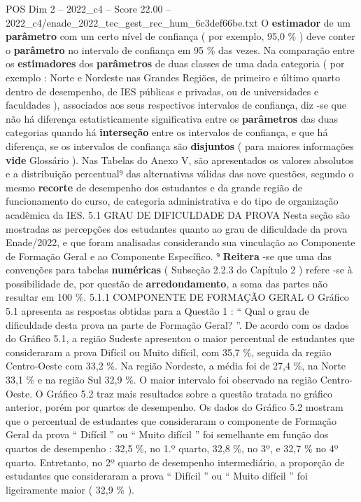\begin{textsample}{POS Dim 2 – 2022\_c4 – Score 22.00 – 2022\_c4/enade\_2022\_tec\_gest\_rec\_hum\_6c3def66be.txt}
O \textbf{estimador} de um \textbf{parâmetro} com um certo nível de confiança ( por exemplo, 95,0 \% ) deve conter o \textbf{parâmetro} no intervalo de confiança em 95 \% das vezes.
Na comparação entre os \textbf{estimadores} dos \textbf{parâmetros} de duas classes de uma dada categoria ( por exemplo : Norte e Nordeste nas Grandes Regiões, de primeiro e último quarto dentro de desempenho, de IES públicas e privadas, ou de universidades e faculdades ), associados aos seus respectivos intervalos de confiança, diz -se que não há diferença estatisticamente significativa entre os \textbf{parâmetros} das duas categorias quando há \textbf{interseção} entre os intervalos de confiança, e que há diferença, se os intervalos de confiança são \textbf{disjuntos} ( para maiores informações \textbf{vide} Glossário ).
Nas Tabelas do Anexo V, são apresentados os valores absolutos e a distribuição percentual⁹ das alternativas válidas das nove questões, segundo o mesmo \textbf{recorte} de desempenho dos estudantes e da grande região de funcionamento do curso, de categoria administrativa e do tipo de organização acadêmica da IES. 5.1 GRAU DE DIFICULDADE DA PROVA Nesta seção são mostradas as percepções dos estudantes quanto ao grau de dificuldade da prova Enade/2022, e que foram analisadas considerando sua vinculação ao Componente de Formação Geral e ao Componente Específico. ⁹ \textbf{Reitera} -se que uma das convenções para tabelas \textbf{numéricas} ( Subseção 2.2.3 do Capítulo 2 ) refere -se à possibilidade de, por questão de \textbf{arredondamento}, a soma das partes não resultar em 100 \%. 5.1.1 COMPONENTE DE FORMAÇÃO GERAL O Gráfico 5.1 apresenta as respostas obtidas para a Questão 1 : “ Qual o grau de dificuldade desta prova na parte de Formação Geral? ”.
De acordo com os dados do Gráfico 5.1, a região Sudeste apresentou o maior percentual de estudantes que consideraram a prova Difícil ou Muito difícil, com 35,7 \%, seguida da região Centro-Oeste com 33,2 \%.
Na região Nordeste, a média foi de 27,4 \%, na Norte 33,1 \% e na região Sul 32,9 \%.
O maior intervalo foi observado na região Centro-Oeste.
O Gráfico 5.2 traz mais resultados sobre a questão tratada no gráfico anterior, porém por quartos de desempenho.
Os dados do Gráfico 5.2 mostram que o percentual de estudantes que consideraram o componente de Formação Geral da prova “ Difícil ” ou “ Muito difícil ” foi semelhante em função dos quartos de desempenho : 32,5 \%, no 1.º quarto, 32,8 \%, no 3º, e 32,7 \% no 4º quarto.
Entretanto, no 2º quarto de desempenho intermediário, a proporção de estudantes que consideraram a prova “ Difícil ” ou “ Muito difícil ” foi ligeiramente maior ( 32,9 \% ).

\end{textsample}
